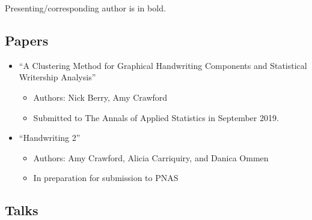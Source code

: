 \documentclass[]{book}
\providecommand{\tightlist}{%
  \setlength{\itemsep}{0pt}\setlength{\parskip}{0pt}}
\begin{document}
Presenting/corresponding author is in bold.

\hypertarget{papers}{%
\subsection{Papers}\label{papers}}

\begin{itemize}
\tightlist
\item
  ``A Clustering Method for Graphical Handwriting Components and Statistical Writership Analysis''

  \begin{itemize}
  \tightlist
  \item
    Authors: Nick Berry, Amy Crawford
  \item
    Submitted to The Annals of Applied Statistics in September 2019.
  \end{itemize}
\item
  ``Handwriting 2''

  \begin{itemize}
  \tightlist
  \item
    Authors: Amy Crawford, Alicia Carriquiry, and Danica Ommen
  \item
    In preparation for submission to PNAS
  \end{itemize}
\end{itemize}

\hypertarget{talks}{%
\subsection{Talks}\label{talks}}
\end{document}
